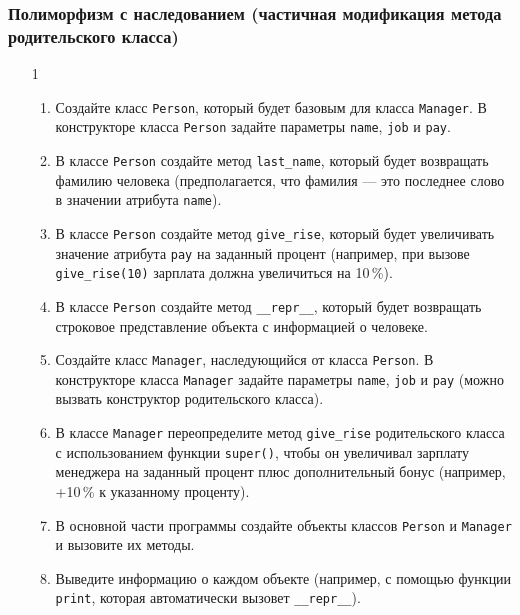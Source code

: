 \subsubsection{Полиморфизм с наследованием (частичная модификация метода родительского класса)}
\begin{enumerate}
\item[1] 
\begin{enumerate}[leftmargin=*]
    \item Создайте класс \texttt{Person}, который будет базовым для класса \texttt{Manager}. В конструкторе класса \texttt{Person} задайте параметры \texttt{name}, \texttt{job} и \texttt{pay}.
    
    \item В классе \texttt{Person} создайте метод \texttt{last\_name}, который будет возвращать фамилию человека (предполагается, что фамилия — это последнее слово в значении атрибута \texttt{name}).
    
    \item В классе \texttt{Person} создайте метод \texttt{give\_rise}, который будет увеличивать значение атрибута \texttt{pay} на заданный процент (например, при вызове \texttt{give\_rise(10)} зарплата должна увеличиться на 10\,\%).
    
    \item В классе \texttt{Person} создайте метод \texttt{\_\_repr\_\_}, который будет возвращать строковое представление объекта с информацией о человеке.
    
    \item Создайте класс \texttt{Manager}, наследующийся от класса \texttt{Person}. В конструкторе класса \texttt{Manager} задайте параметры \texttt{name}, \texttt{job} и \texttt{pay} (можно вызвать конструктор родительского класса).
    
    \item В классе \texttt{Manager} переопределите метод \texttt{give\_rise} родительского класса с использованием функции \texttt{super()}, чтобы он увеличивал зарплату менеджера на заданный процент плюс дополнительный бонус (например, +10\,\% к указанному проценту).
    
    \item В основной части программы создайте объекты классов \texttt{Person} и \texttt{Manager} и вызовите их методы.
    
    \item Выведите информацию о каждом объекте (например, с помощью функции \texttt{print}, которая автоматически вызовет \texttt{\_\_repr\_\_}).
\end{enumerate}


\end{enumerate}
